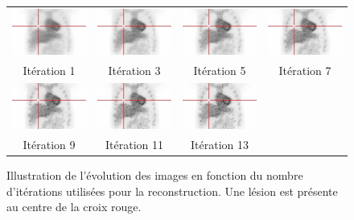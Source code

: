 \begin{figure}
\centering
\begin{tabular}{c c c c}
 \includegraphics[width=3cm]{images/ite1} & \includegraphics[width=3cm]{images/ite3} & \includegraphics[width=3cm]{images/ite5} & \includegraphics[width=3cm]{images/ite7} \\
Itération 1  & Itération 3 & Itération 5 & Itération 7 \\
\hline
 \includegraphics[width=3cm]{images/ite9} & \includegraphics[width=3cm]{images/ite11} & \includegraphics[width=3cm]{images/ite13} &  \\
Itération 9  & Itération 11 & Itération 13 &\\
\end{tabular}

\caption[Illustration de l'évolution des lésions en fonction du nombre d'itérations]{Illustration de l'évolution des images en fonction du nombre d'itérations utilisées pour la reconstruction. Une lésion est présente au centre de la croix rouge.}
\label{fig:evolRecon}
\end{figure}

